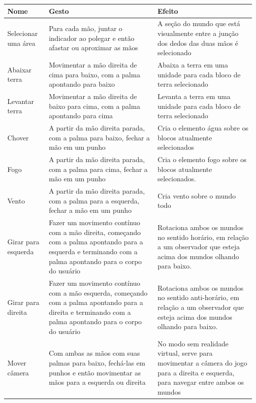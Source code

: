 \begin{quadro}[htb]
	\begin{tabular}{|>{\centering\arraybackslash}m{2.1cm}|>{\centering\arraybackslash}m{6.4cm}|>{\centering\arraybackslash}m{6.4cm}|}
		\hline 
		\textbf{Nome} & \textbf{Gesto} & \textbf{Efeito} \\
		\hline 
		Selecionar uma área
		&Para cada mão, juntar o indicador ao polegar e então afastar ou 
		aproximar as mãos
		&A seção do mundo que está visualmente entre a junção dos dedos 
		das duas mãos é selecionado
		\\ \hline 
		Abaixar terra
		&Movimentar a mão direita de cima para baixo, com a palma 
		apontando para baixo
		&Abaixa a terra em uma unidade para cada bloco de terra selecionado
		\\ \hline 
		Levantar terra
		&Movimentar a mão direita de baixo para cima, com a palma 
		apontando para cima
		&Levanta a terra em uma unidade para cada bloco de terra selecionado
		\\ \hline 
		Chover
		&A partir da mão direita parada, com a palma para baixo, 
		fechar a mão em um punho
		&Cria o elemento água sobre os blocos atualmente selecionados
		\\ \hline 
		Fogo
		&A partir da mão direita parada, com a palma para cima, fechar 
		a mão em um punho
		&Cria o elemento fogo sobre os blocos atualmente selecionados.
		\\ \hline 
		Vento
		&A partir da mão direita parada, com a palma para a esquerda, 
		fechar a mão em um punho
		&Cria vento sobre o mundo todo
		\\ \hline 
		Girar para esquerda
		&Fazer um movimento contínuo com a mão direita, começando com a 
		palma apontando para a esquerda e terminando com a palma apontando 
		para o corpo do usuário
		&Rotaciona ambos os mundos no sentido horário, em relação a um 
		observador que esteja acima dos mundos olhando para baixo.
		\\ \hline 
		Girar para direita
		&Fazer um movimento contínuo com a mão esquerda, começando com 
		a palma apontando para a direita e terminando com a palma apontando 
		para o corpo do usuário
		&Rotaciona ambos os mundos no sentido anti-horário, em relação a 
		um observador que esteja acima dos mundos olhando para baixo.
		\\ \hline 
		Mover câmera
		&Com ambas as mãos com suas palmas para baixo, fechá-las em punhos 
		e então movimentar as mãos para a esquerda ou direita
		&No modo sem realidade virtual, serve para movimentar a câmera do 
		jogo para a direita e esquerda, para navegar entre ambos os mundos
		\\ \hline 
	\end{tabular} 
	
	\legend{\fonteAP}
	\label{tabela:gestos}
\end{quadro}

